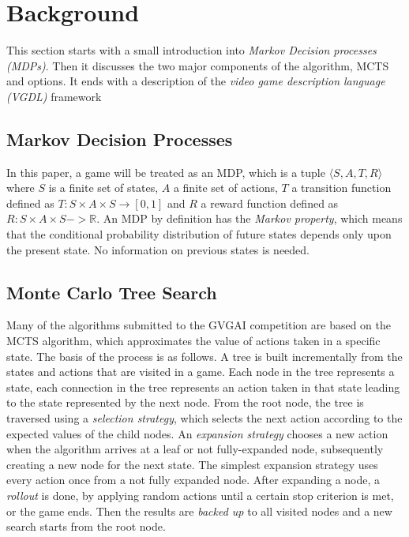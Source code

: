 \section{Background}
\label{sec:background}

This section starts with a small introduction into \emph{Markov
Decision processes (MDPs)}. Then it discusses the two major components of the
algorithm, MCTS and options. It ends with a description of the \emph{video game
description language (VGDL)} framework

\subsection{Markov Decision Processes}
\label{subsec:mdps}
In this paper, a game will be treated as an MDP, which is a
tuple $\langle S, A, T, R \rangle$ where $S$ is a finite set of states, $A$ a
finite set of actions, $T$ a transition function defined as $T : S \times A
\times S \rightarrow \left[0,1\right]$ and $R$ a reward function defined as $R:
S \times A \times S -> \mathbb{R}$. An MDP by definition has the \emph{Markov
property}, which means that the conditional probability distribution of future
states depends only upon the present state. No information on previous states
is needed.

\subsection{Monte Carlo Tree Search}
\label{subsec:mcts}
Many of the algorithms submitted to the GVGAI competition are based on the MCTS
algorithm\cn, which approximates the value of actions taken in a specific state.
The basis of the process is as follows. A tree is built incrementally from the
states and actions that are visited in a game.  Each node in the tree represents
a state, each connection in the tree represents an action taken in that state
leading to the state represented by the next node.  From the root node, the tree
is traversed using a \emph{selection strategy}, which selects the next action according
to the expected values of the child nodes. An \emph{expansion strategy} chooses
a new action when the algorithm arrives at a leaf or not fully-expanded node,
subsequently creating a new node for the next state. The simplest expansion
strategy uses every action once from a not fully expanded node. After expanding
a node, a \emph{rollout} is done, by applying random actions until a certain
stop criterion is met, or the game ends. Then the results are \emph{backed up}
to all visited nodes and a new search starts from the root node.


